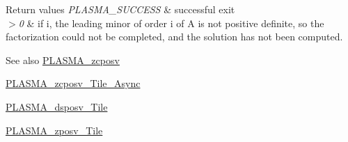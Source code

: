 \begin{DoxyRetVals}{Return values}
{\em P\+L\+A\+S\+M\+A\+\_\+\+S\+U\+C\+C\+E\+S\+S} & successful exit \\
\hline
{\em $>$0} & if i, the leading minor of order i of A is not positive definite, so the factorization could not be completed, and the solution has not been computed.\\
\hline
\end{DoxyRetVals}
\begin{DoxySeeAlso}{See also}
\hyperlink{group__PLASMA__Complex64__t_ga11ee4c71901e8675d5423cfceecaaf43_ga11ee4c71901e8675d5423cfceecaaf43}{P\+L\+A\+S\+M\+A\+\_\+zcposv} 

\hyperlink{group__PLASMA__Complex64__t__Tile__Async_gad582515d56a856b1d1477dbfac676a40_gad582515d56a856b1d1477dbfac676a40}{P\+L\+A\+S\+M\+A\+\_\+zcposv\+\_\+\+Tile\+\_\+\+Async} 

\hyperlink{group__double__Tile_ga7f39f625536bebba5fb1638c19f11af7_ga7f39f625536bebba5fb1638c19f11af7}{P\+L\+A\+S\+M\+A\+\_\+dsposv\+\_\+\+Tile} 

\hyperlink{group__PLASMA__Complex64__t__Tile_gaf7050f109b30dcdea1cedd1a6577d2b9_gaf7050f109b30dcdea1cedd1a6577d2b9}{P\+L\+A\+S\+M\+A\+\_\+zposv\+\_\+\+Tile} 
\end{DoxySeeAlso}
\hypertarget{group__PLASMA__Complex64__t__Tile_ga5eecfe4fcf4814dd939f39c0629d2222_ga5eecfe4fcf4814dd939f39c0629d2222}{}
